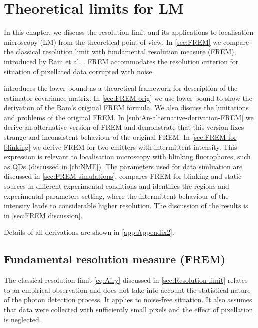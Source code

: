 \chapter{Theoretical limits for LM \label{ch:Theoretical-limits-of the LM}}

In this chapter, we discuss the resolution limit and its applications to localisation microscopy (LM) from the theoretical point of view. In \autoref{sec:FREM} we compare the classical resolution limit with fundamental resolution measure (FREM), introduced by Ram et al. \cite{Ram2006}. FREM accommodates the resolution criterion for situation of pixellated data corrupted with noise.

 introduces the \CR lower bound as a theoretical framework for description of the estimator covariance matrix. In \autoref{sec:FREM orig} we use \CR lower bound to show the derivation of the Ram's original FREM formula. We also discuss the limitations and problems of the original FREM. In \autoref{sub:An-alternative-derivation-FREM} we derive an alternative version of FREM and demonstrate that this version fixes strange and inconsistent behaviour of the original FREM. In \autoref{sec:FREM for blinking} we derive FREM for two emitters with intermittent intensity. This expression is relevant to localisation microscopy with blinking fluorophores, such as QDs (discussed in \autoref{ch:NMF}). The parameters used for data simluation are discussed in \autoref{sec:FREM simulations}.  compares FREM for blinking and static sources in different experimental conditions and identifies the regions and experimental parameters setting, where the intermittent behaviour of the intensity leads to considerable higher resolution. The discussion of the results is in \autoref{sec:FREM discussion}. 

Details of all derivations are shown in \autoref{app:Appendix2}.

\section{Fundamental resolution measure (FREM)\label{sec:FREM}}

The classical resolution limit \autoref{eq:Airy} discussed in \autoref{sec:Resolution limit} relates to an empirical observation and does not take into account the statistical nature of the photon detection process. It applies to noise-free situation. It also assumes that data were collected with sufficiently small pixels and the effect of pixellation is neglected. 

